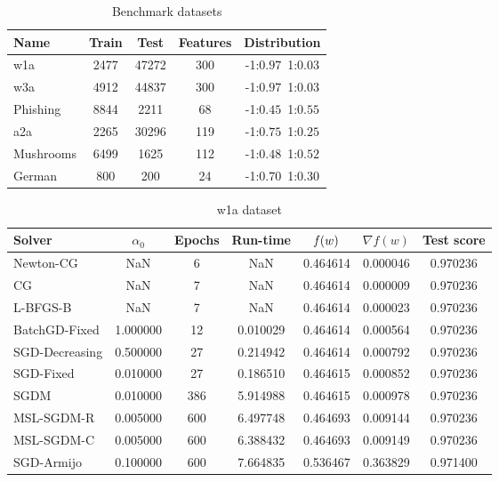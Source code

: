 
\begin{table}
\centering
\caption{Benchmark datasets}
\label{tab:datasets}
\begin{tabular}{lSSSc}
\toprule
Name & {Train} & {Test} & {Features} & {Distribution} \\
\midrule
w1a & 2477 & 47272 & 300 & -1:$0.97$\,\,\,1:$0.03$ \\
w3a & 4912 & 44837 & 300 & -1:$0.97$\,\,\,1:$0.03$ \\
Phishing & 8844 & 2211 & 68 & -1:$0.45$\,\,\,1:$0.55$ \\
a2a & 2265 & 30296 & 119 & -1:$0.75$\,\,\,1:$0.25$ \\
Mushrooms & 6499 & 1625 & 112 & -1:$0.48$\,\,\,1:$0.52$ \\
German & 800 & 200 & 24 & -1:$0.70$\,\,\,1:$0.30$ \\
\bottomrule
\end{tabular}
\end{table}

\begin{table}
\centering
\caption{w1a dataset}
\label{tab:w1a-table}
\begin{tabular}{lS[round-precision=3]S[drop-zero-decimal]S[round-precision=4]S[round-precision=6]S[exponent-mode=scientific]S[round-precision=6]}
\toprule
Solver & {$\alpha_0$} & {Epochs} & {Run-time} & {$\operatorname*{\mathit{f}}(w)$} & {$\nabla f(w)$} & {Test score} \\
\midrule
Newton-CG & NaN & 6 & NaN & 0.464614 & 0.000046 & 0.970236 \\
CG & NaN & 7 & NaN & 0.464614 & 0.000009 & 0.970236 \\
L-BFGS-B & NaN & 7 & NaN & 0.464614 & 0.000023 & 0.970236 \\
BatchGD-Fixed & 1.000000 & 12 & 0.010029 & 0.464614 & 0.000564 & 0.970236 \\
SGD-Decreasing & 0.500000 & 27 & 0.214942 & 0.464614 & 0.000792 & 0.970236 \\
SGD-Fixed & 0.010000 & 27 & 0.186510 & 0.464615 & 0.000852 & 0.970236 \\
SGDM & 0.010000 & 386 & 5.914988 & 0.464615 & 0.000978 & 0.970236 \\
MSL-SGDM-R & 0.005000 & 600 & 6.497748 & 0.464693 & 0.009144 & 0.970236 \\
MSL-SGDM-C & 0.005000 & 600 & 6.388432 & 0.464693 & 0.009149 & 0.970236 \\
SGD-Armijo & 0.100000 & 600 & 7.664835 & 0.536467 & 0.363829 & 0.971400 \\
\bottomrule
\end{tabular}
\end{table}


